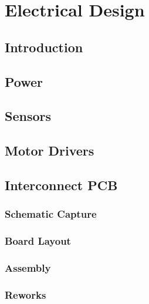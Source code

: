 \chapter{Electrical Design}
\section{Introduction}



\section{Power}



\section{Sensors}



\section{Motor Drivers}


\section{Interconnect PCB}

\subsection{Schematic Capture}

\subsection{Board Layout}

\subsection{Assembly}

\subsection{Reworks}
